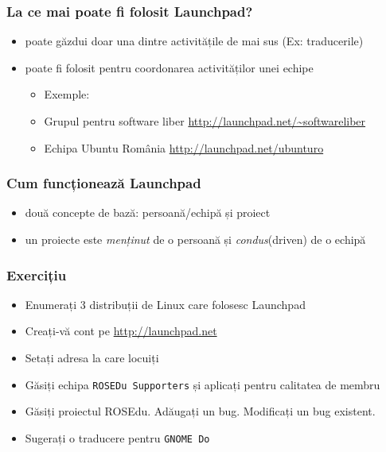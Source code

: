 \documentclass{beamer}
\begin{document}
\begin{frame}
\frametitle{La ce mai poate fi folosit Launchpad?}
\begin{itemize}
\item poate găzdui doar una dintre activitățile de mai sus (Ex: traducerile)
\item poate fi folosit pentru coordonarea activităților unei echipe
\begin{itemize}
\item Exemple: 
\item Grupul pentru software liber \url{http://launchpad.net/~softwareliber}
\item Echipa Ubuntu România \url{http://launchpad.net/ubunturo}
\end{itemize}
\end{itemize}
\end{frame}

\begin{frame}
\frametitle{Cum funcționează Launchpad}
\begin{itemize}
\item două concepte de bază: persoană/echipă și proiect
\item un proiecte este \emph{menținut} de o persoană și \emph{condus}(driven) de o echipă
\end{itemize}
\end{frame}

\begin{frame}
\frametitle{Exercițiu}
\begin{itemize}
\item Enumerați 3 distribuții de Linux care folosesc Launchpad
\item Creați-vă cont pe \url{http://launchpad.net}
\item Setați adresa la care locuiți
\item Găsiți echipa \texttt{ROSEDu Supporters} și aplicați pentru calitatea de membru
\item Găsiți proiectul ROSEdu. Adăugați un bug. Modificați un bug existent.
\item Sugerați o traducere pentru \texttt{GNOME Do} %
\end{itemize}
\end{frame}
\end{document}
